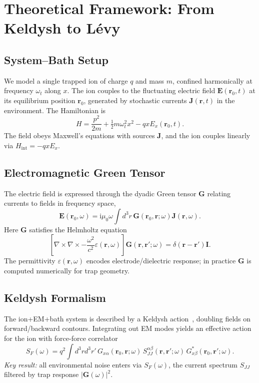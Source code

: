 \section{Theoretical Framework: From Keldysh to L\'evy}

\subsection{System--Bath Setup}
We model a single trapped ion of charge $q$ and mass $m$, confined harmonically at frequency $\omega_t$ along $x$.
The ion couples to the fluctuating electric field $\mathbf{E}(\mathbf{r}_0,t)$ at its equilibrium position $\mathbf{r}_0$, generated by stochastic currents $\mathbf{J}(\mathbf{r},t)$ in the environment.
The Hamiltonian is
\begin{equation}
H = \frac{p^2}{2m} + \tfrac{1}{2} m \omega_t^2 x^2 - q x E_x(\mathbf{r}_0,t).
\end{equation}
The field obeys Maxwell's equations with sources $\mathbf{J}$, and the ion couples linearly via $H_{\text{int}} = -q x E_x$.

\subsection{Electromagnetic Green Tensor}
The electric field is expressed through the dyadic Green tensor $\mathbf{G}$ relating currents to fields in frequency space,
\begin{equation}
\mathbf{E}(\mathbf{r}_0,\omega) = \mathrm{i}\mu_0 \omega \int d^3r\, \mathbf{G}(\mathbf{r}_0,\mathbf{r};\omega) \mathbf{J}(\mathbf{r},\omega).
\end{equation}
Here $\mathbf{G}$ satisfies the Helmholtz equation
\begin{equation}
\left[\nabla\times\nabla\times - \frac{\omega^2}{c^2}\varepsilon(\mathbf{r},\omega)\right]\mathbf{G}(\mathbf{r},\mathbf{r}';\omega) = \delta(\mathbf{r}-\mathbf{r}')\mathbf{I}.
\end{equation}
The permittivity $\varepsilon(\mathbf{r},\omega)$ encodes electrode/dielectric response; in practice $\mathbf{G}$ is computed numerically for trap geometry.

\subsection{Keldysh Formalism}
The ion+EM+bath system is described by a Keldysh action~\cite{Kamenev2011}, doubling fields on forward/backward contours.
Integrating out EM modes yields an effective action for the ion with force-force correlator
\begin{equation}
S_F(\omega) = q^2 \int d^3r d^3r'\, G_{x\alpha}(\mathbf{r}_0,\mathbf{r};\omega)\, S_{JJ}^{\alpha\beta}(\mathbf{r},\mathbf{r}';\omega)\, G^*_{x\beta}(\mathbf{r}_0,\mathbf{r}';\omega).
\label{eq:SF}
\end{equation}
\textit{Key result:} all environmental noise enters via $S_F(\omega)$, the current spectrum $S_{JJ}$ filtered by trap response $|\mathbf{G}(\omega)|^2$.


